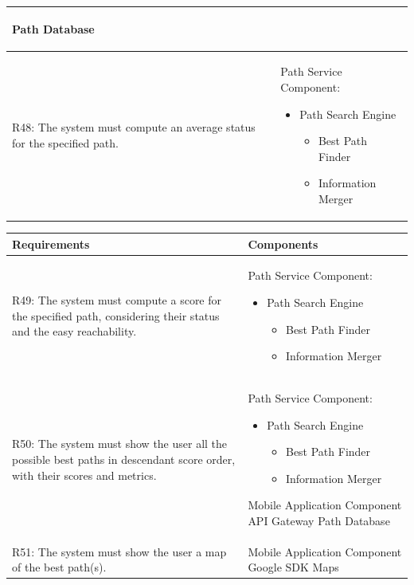 \begin{table}[ht]
\begin{tabular}{|p{9cm}|p{6cm}|}
\begin{itemize}
\begin{itemize}
        \end{itemize}
\end{itemize}
Path Database
\\ \hline
R48: The system must compute an average status for the specified path. 
&
Path Service Component:
\begin{itemize}
    \item Path Search Engine
        \begin{itemize}
            \item Best Path Finder
            \item Information Merger
            \newline
        \end{itemize}
\end{itemize}
\\ \hline
\end{tabular}
\end{table}
\newpage
\begin{table}[ht]
\begin{tabular}{|p{9cm}|p{6cm}|}
\hline
\textbf{Requirements}      & \multicolumn{1}{l|}{\textbf{Components}}\\ \hline
R49: The system must compute a score for the specified path, considering their status and the easy reachability. 
&
Path Service Component:
\begin{itemize}
    \item Path Search Engine
        \begin{itemize}
            \item Best Path Finder
            \item Information Merger
            \newline
        \end{itemize}
\end{itemize}
\\ \hline
R50: The system must show the user all the possible best paths in descendant score order, with their scores and
metrics. 
&
Path Service Component:
\begin{itemize}
    \item Path Search Engine
        \begin{itemize}
            \item Best Path Finder
            \item Information Merger
        \end{itemize}
\end{itemize}
Mobile Application Component
\newline
API Gateway
\newline
Path Database
\\ \hline
R51: The system must show the user a map of the best path(s). 
&
Mobile Application Component
\newline
Google SDK Maps 
\\ \hline
\end{tabular}
\end{table}